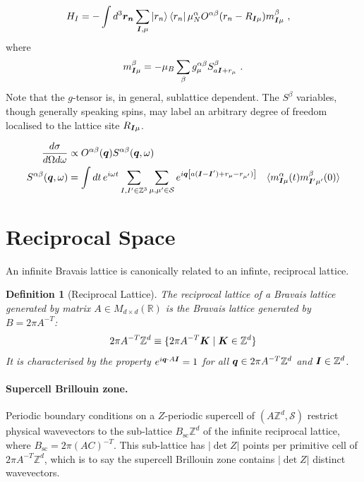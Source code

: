 \documentclass[12pt,a4paper]{article}
\newtheorem{definition}{Definition}
\newcommand\bs[1]{\ensuremath\boldsymbol{#1}}
\begin{document}
\begin{align}
    H_I &= - \int d^3 \bs{r_n}  \sum_{\bs{I}, \mu} \ket{r_n}\bra{r_n} \mu_N^\alpha O^{\alpha \beta}(r_n - R_{\bs{I}\mu}) m^\beta_{\bs{I}\mu}~,
\end{align}
where 
\begin{align}
    m^\beta_{\bs{I}\mu} = -\mu_B \sum_\beta  g_\mu^{\alpha\beta} S^\beta_{a\bs{I}+r_\mu}~.
\end{align}
Note that the $g$-tensor is, in general, sublattice dependent. The $S^\beta$ variables, though generally speaking spins, may label an arbitrary degree of freedom localised to the lattice site $R_{\bs{I} \mu}$.

\begin{align}
    \frac{d\sigma}{d\Omega d\omega}  &\propto O^{\alpha\beta}(\bs{q}) S^{\alpha \beta}(\bs{q}, \omega)\\
     S^{\alpha \beta} (\bs{q}, \omega) &= \int dt\,e^{i\omega t}\sum_{I, I' \in \mathbb{Z}^3} \sum_{\mu, \mu' \in \mathcal{S}} e^{ i \bs{q}  \left[a(\bs{I}-\bs{I}') + r_\mu  -  r_{\mu'}) \right] } 
                                       & \langle m^{\alpha}_{\bs{I}\mu}(t) m^{\beta}_{\bs{I}'\mu'}(0) \rangle
\end{align}


\section{Reciprocal Space}

An infinite Bravais lattice is canonically related to an infinte, reciprocal lattice. 

\begin{definition}[Reciprocal Lattice]
    The reciprocal lattice of a Bravais lattice generated by matrix $A \in M_{d\times d}(\mathbb{R})$ is the
    Bravais lattice generated by $B = 2\pi A^{-T}$:
    \[
        2\pi A^{-T} \mathbb{Z}^d \equiv \{ 2\pi A^{-T} \bs{K} \mid \bs{K} \in \mathbb{Z}^d \}
    \]
    It is characterised by the property $e^{i \bs{q} \cdot A\bs{I}} = 1$ for all $\bs{q} \in 2\pi A^{-T}\mathbb{Z}^d$
    and $\bs{I} \in \mathbb{Z}^d$.
\end{definition}

\paragraph{Supercell Brillouin zone.}
Periodic boundary conditions on a $Z$-periodic supercell of $(A\mathbb{Z}^d, \mathcal{S})$ restrict physical
wavevectors to the sub-lattice $B_{\mathrm{sc}} \mathbb{Z}^d$ of the infinite reciprocal lattice, where
$B_{\mathrm{sc}} = 2\pi(AC)^{-T}$. This sub-lattice has $|\det Z|$ points per primitive
cell of $2\pi A^{-T}\mathbb{Z}^d$, which is to say the supercell Brillouin zone contains $|\det Z|$ distinct wavevectors.
\end{document}
